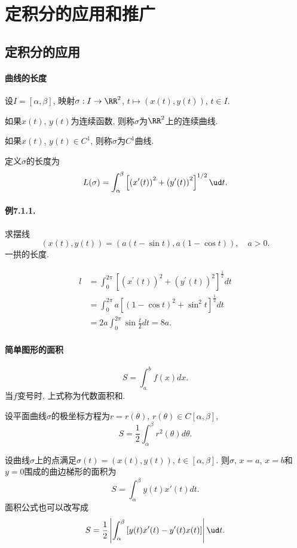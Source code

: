 \section{定积分的应用和推广}
\subsection{定积分的应用}

\paragraph{曲线的长度}

设$I=[\alpha,\beta]$, 映射$\sigma:I\to\RR^{2}$, $t\mapsto\left(x(t),y(t)\right)$,
$t\in I$. 

如果$x(t)$, $y(t)$为连续函数, 则称$\sigma$为$\RR^{2}$上的连续曲线. 

如果$x(t)$, $y(t)\in C^{1}$, 则称$\sigma$为$C^{1}$曲线.

定义$\sigma$的长度为
\[
L(\sigma)=\int_{\alpha}^{\beta}\left[\left(x'(t)\right)^{2}+\left(y'(t)\right)^{2}\right]^{1/2}\ud t.
\]


\paragraph{例7.1.1. }

求摆线
\[
\left(x(t),y(t)\right)=\left(a(t-\sin t),a(1-\cos t)\right),\quad a>0.
\]
一拱的长度.

\[
\begin{aligned}l & =\int_{0}^{2\pi}\left[\left(x^{\prime}(t)\right)^{2}+\left(y^{\prime}(t)\right)^{2}\right]^{\frac{1}{2}}dt\\
	& =\int_{0}^{2\pi}a\left[(1-\cos t)^{2}+\sin^{2}t\right]^{\frac{1}{2}}dt\\
	& =2a\int_{0}^{2\pi}\sin\frac{t}{2}dt=8a.
\end{aligned}
\]


\paragraph{简单图形的面积}

\[
S=\int_{a}^{b}f(x)dx.
\]
当$f$变号时, 上式称为代数面积和.

设平面曲线$\sigma$的极坐标方程为$r=r(\theta)$, $r(\theta)\in C[\alpha,\beta]$,
\[
S=\frac{1}{2}\int_{\alpha}^{\beta}r^{2}(\theta)d\theta.
\]

设曲线$\sigma$上的点满足$\sigma(t)=\left(x(t),y(t)\right)$, $t\in[\alpha,\beta]$.
则$\sigma$, $x=a$, $x=b$和$y=0$围成的曲边梯形的面积为
\[
S=\int_{\alpha}^{\beta}y(t)x'(t)dt.
\]
面积公式也可以改写成
\[
S=\frac{1}{2}\left|\int_{\alpha}^{\beta}\left[y(t)x'(t)-y'(t)x(t)\right]\right|\ud t.
\]


